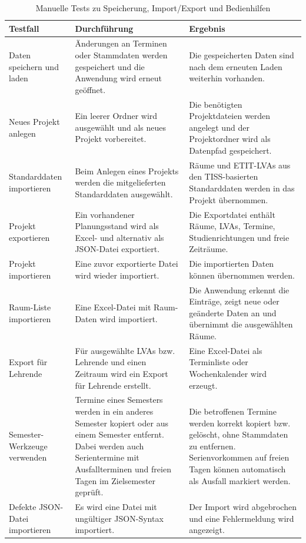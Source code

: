\documentclass[12pt,a4paper]{article}
\begin{document}
\begin{table}[H]
\centering
\caption{Manuelle Tests zu Speicherung, Import/Export und Bedienhilfen}
\label{tab:test-speicherung}
\footnotesize
\setlength{\tabcolsep}{4pt}
\begin{tabularx}{\textwidth}{|L{3cm}|Y|Y|}
\hline
\textbf{Testfall} & \textbf{Durchführung} & \textbf{Ergebnis} \\
\hline
Daten speichern und laden & Änderungen an Terminen oder Stammdaten werden gespeichert und die Anwendung wird erneut geöffnet. & Die gespeicherten Daten sind nach dem erneuten Laden weiterhin vorhanden. \\
\hline
Neues Projekt anlegen & Ein leerer Ordner wird ausgewählt und als neues Projekt vorbereitet. & Die benötigten Projektdateien werden angelegt und der Projektordner wird als Datenpfad gespeichert. \\
\hline
Standarddaten importieren & Beim Anlegen eines Projekts werden die mitgelieferten Standarddaten ausgewählt. & Räume und ETIT-LVAs aus den TISS-basierten Standarddaten werden in das Projekt übernommen. \\
\hline
Projekt exportieren & Ein vorhandener Planungsstand wird als Excel- und alternativ als JSON-Datei exportiert. & Die Exportdatei enthält Räume, LVAs, Termine, Studienrichtungen und freie Zeiträume. \\
\hline
Projekt importieren & Eine zuvor exportierte Datei wird wieder importiert. & Die importierten Daten können übernommen werden. \\
\hline
Raum-Liste importieren & Eine Excel-Datei mit Raum-Daten wird importiert. & Die Anwendung erkennt die Einträge, zeigt neue oder geänderte Daten an und übernimmt die ausgewählten Räume. \\
\hline
Export für Lehrende & Für ausgewählte LVAs bzw. Lehrende und einen Zeitraum wird ein Export für Lehrende erstellt. & Eine Excel-Datei als Terminliste oder Wochenkalender wird erzeugt. \\
\hline
Semester-Werkzeuge verwenden & Termine eines Semesters werden in ein anderes Semester kopiert oder aus einem Semester entfernt. Dabei werden auch Serientermine mit Ausfallterminen und freien Tagen im Zielsemester geprüft. & Die betroffenen Termine werden korrekt kopiert bzw. gelöscht, ohne Stammdaten zu entfernen. Serienvorkommen auf freien Tagen können automatisch als Ausfall markiert werden. \\
\hline
Defekte JSON-Datei importieren & Es wird eine Datei mit ungültiger JSON-Syntax importiert. & Der Import wird abgebrochen und eine Fehlermeldung wird angezeigt. \\

\end{tabularx}
\end{table}
\end{document}

